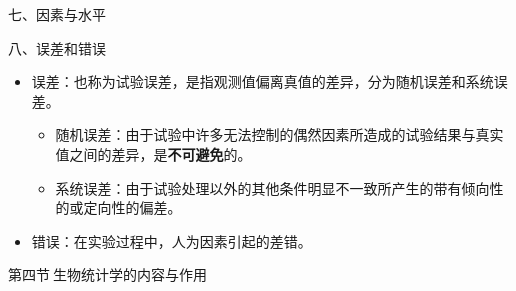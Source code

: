 \documentclass[
  10pt,
  ignorenonframetext,
]{beamer}
\providecommand{\tightlist}{%
  \setlength{\itemsep}{0pt}\setlength{\parskip}{0pt}}
\begin{document}
\begin{frame}{七、因素与水平}
\protect\hypertarget{ux4e03ux56e0ux7d20ux4e0eux6c34ux5e73}{}
\end{frame}

\begin{frame}{八、误差和错误}
\protect\hypertarget{ux516bux8befux5deeux548cux9519ux8bef}{}
\begin{itemize}
\tightlist
\item
  误差：也称为试验误差，是指观测值偏离真值的差异，分为随机误差和系统误差。

  \begin{itemize}
  \tightlist
  \item
    随机误差：由于试验中许多无法控制的偶然因素所造成的试验结果与真实值之间的差异，是\textbf{不可避免}的。
  \item
    系统误差：由于试验处理以外的其他条件明显不一致所产生的带有倾向性的或定向性的偏差。
  \end{itemize}
\item
  错误：在实验过程中，人为因素引起的差错。
\end{itemize}
\end{frame}

\begin{frame}{第四节\(~\)生物统计学的内容与作用}
\protect\hypertarget{ux7b2cux56dbux8282ux751fux7269ux7edfux8ba1ux5b66ux7684ux5185ux5bb9ux4e0eux4f5cux7528}{}
\end{frame}
\end{document}

